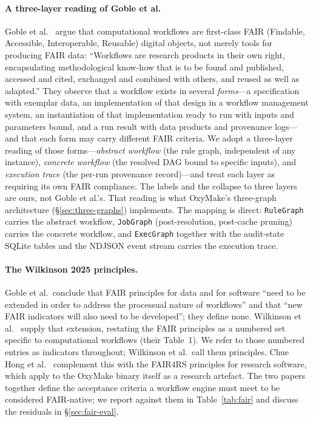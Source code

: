 \documentclass[12pt,a4paper]{article}
\newcommand{\code}[1]{{\texttt{\small\color{inlinecode}#1}}}
\begin{document}
\paragraph{A three-layer reading of Goble et al.}
Goble et al.~\cite{gobleFAIRComputationalWorkflows2020} argue that
computational workflows are first-class FAIR (Findable, Accessible,
Interoperable, Reusable) digital objects, not merely tools for producing
FAIR data: ``Workflows are research products in their own right,
encapsulating methodological know-how that is to be found and published,
accessed and cited, exchanged and combined with others, and reused as
well as adapted.'' They observe that a workflow exists in several
\emph{forms}---a specification with exemplar data, an implementation of
that design in a workflow management system, an instantiation of that
implementation ready to run with inputs and parameters bound, and a run
result with data products and provenance logs---and that each form may
carry different FAIR criteria. We adopt a three-layer reading of those
forms---\emph{abstract workflow} (the rule graph, independent of any
instance), \emph{concrete workflow} (the resolved DAG bound to specific
inputs), and \emph{execution trace} (the per-run provenance
record)---and treat each layer as requiring its own FAIR compliance.
The labels and the collapse to three layers are ours, not Goble et
al.'s. That reading is what OxyMake's three-graph architecture
(\S\ref{sec:three-graphs}) implements. The mapping is direct:
\code{RuleGraph} carries the abstract workflow,
\code{JobGraph} (post-resolution, post-cache pruning) carries the
concrete workflow, and \code{ExecGraph} together with the audit-state
SQLite tables and the NDJSON event stream carries the execution
trace.

\paragraph{The Wilkinson 2025 principles.}
Goble et al.\ conclude that FAIR principles for data and for software
``need to be extended in order to address the processual nature of
workflows'' and that ``new FAIR indicators will also need to be
developed''; they define none.
Wilkinson et al.~\cite{wilkinsonApplyingFAIRPrinciples2025} supply that
extension, restating the FAIR principles as a numbered set specific to
computational workflows (their Table~1). We refer to those numbered
entries as indicators throughout; Wilkinson et al.\ call them
principles.
Chue Hong et al.~\cite{chueHongFAIR4RSPrinciples2022}
complement this with the FAIR4RS principles for research software,
which apply to the OxyMake binary itself as a research artefact.
The two papers together define the
acceptance criteria a workflow engine must meet to be considered
FAIR-native; we report against them in
Table~\ref{tab:fair} and discuss the residuals in
\S\ref{sec:fair-eval}.
\end{document}
